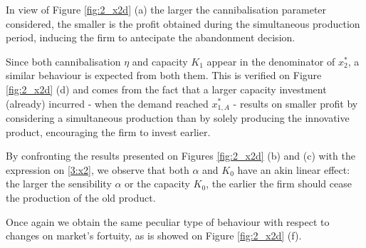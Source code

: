 In view of Figure \ref{fig:2_x2d} (a) the larger the cannibalisation parameter considered, the smaller is the profit obtained during the simultaneous production period, inducing the firm to antecipate the abandonment decision. 

Since both cannibalisation $\eta$ and capacity $K_1$ appear in the denominator of $x^*_2$, a similar behaviour is expected from both them. This is verified on Figure \ref{fig:2_x2d} (d) and comes from the fact that a larger capacity investment (already) incurred - when the demand reached $x^*_{1,A}$ - results on smaller profit by considering a simultaneous production than by solely producing the innovative product, encouraging the firm to invest earlier.

By confronting the results presented on Figures \ref{fig:2_x2d} (b) and (c) with the expression on \eqref{3:x2}, we observe that both $\alpha$ and $K_0$ have an akin linear effect: the larger the sensibility $\alpha$ or the capacity $K_0$, the earlier the firm should cease the production of the old product.

Once again we obtain the same peculiar type of behaviour with respect to changes on market's fortuity, as is showed on Figure \ref{fig:2_x2d} (f).




